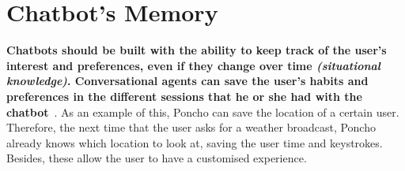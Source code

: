 \documentclass[a4paper,10pt]{article}
\begin{document}


\section{Chatbot's Memory}

\textbf{Chatbots should be built with the ability to keep track of the user's interest and preferences, even if they change over time \textit{(situational knowledge)}. Conversational agents can save the user's habits and preferences in the different sessions that he or she had with the chatbot}~\cite{shneiderman1997direct}. As an example of this, Poncho can save the location of a certain user. Therefore, the next time that the user asks for a weather broadcast, Poncho already knows which location to look at, saving the user time and keystrokes. Besides, these allow the user to have a customised experience. 

\end{document}
